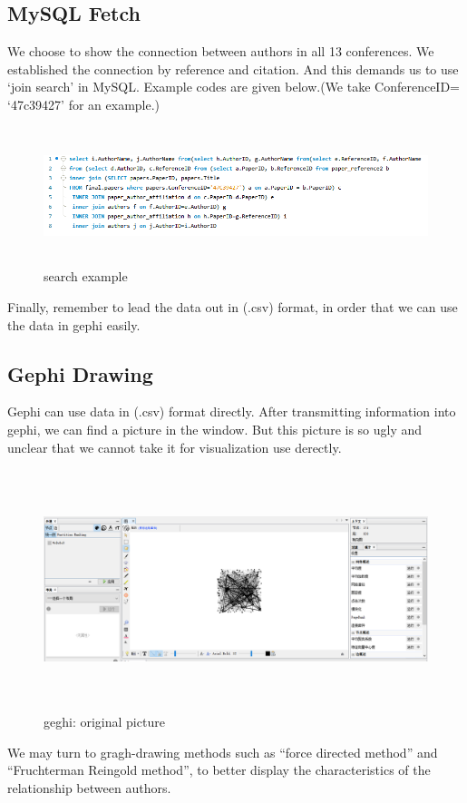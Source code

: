 \documentclass{book}
\begin{document}
\subsection{MySQL Fetch}

We choose to show the connection between authors in all 13 conferences. We established the connection by reference and citation. And this demands us to use `join search' in MySQL. Example codes are given below.(We take ConferenceID= `47c39427' for an example.)

\begin{figure}[H]
\centering
\includegraphics[height=4.0cm,width=18cm]{img/yhb_my_1.png}
\caption{search example}
\end{figure}

Finally, remember to lead the data out in (.csv) format, in order that we can use the data in gephi easily.

\subsection{Gephi Drawing}

Gephi can use data in (.csv) format directly. After transmitting information into gephi, we can find a picture in the window. But this picture is so ugly and unclear that we cannot take it for visualization use derectly.  

\begin{figure}[H]
\centering
\includegraphics[height=7.0cm,width=18.0cm]{img/yhb_ge_1.png}
\caption{geghi: original picture}
\end{figure}
We may turn to gragh-drawing methods such as ``force directed method'' and ``Fruchterman Reingold method'', to better display the characteristics of the relationship between authors.
\end{document}
